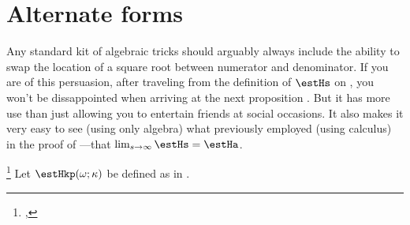 \section{Alternate forms}
Any standard kit of algebraic tricks should arguably always include the ability to
swap the location of a square root between numerator and denominator.
If you are of this persuasion, after traveling from
the definition of $\estHs$ on , you won't be dissappointed when arriving
at the next proposition .
But it has more use than just allowing you to entertain friends at social occasions.
It also makes it very easy to see (using only algebra) what previously
employed  (using calculus)
in the proof of ---that $\lim_{s\to\infty}\estHs=\estHa$.
\begin{proposition}                                                               %
\footnote{                                                                        %
  ,                                   %
  }                                                                               %
\label{prop:Hs}                                                                   %
Let $\estHkp(\omega; \kappa)$ be defined as in .
\end{proposition}
